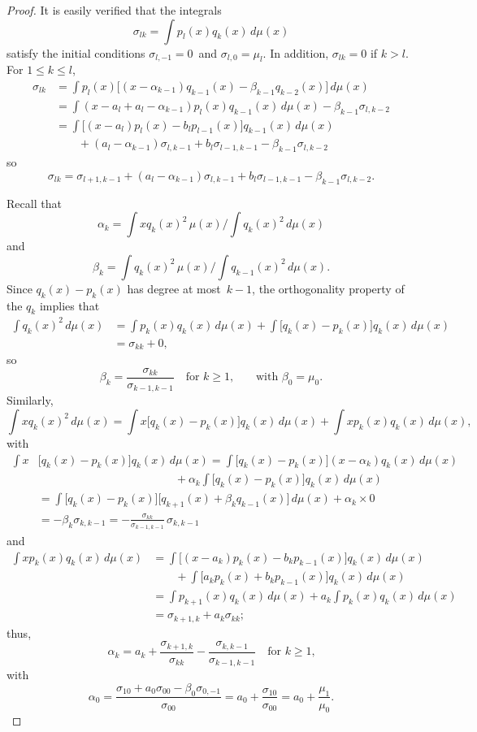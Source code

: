 \documentclass[12pt,a4paper]{article}
\begin{document}
\begin{proof}
It is easily verified that the integrals
\[
\sigma_{lk}=\int p_l(x)q_k(x)\,d\mu(x)
\]
satisfy the initial conditions $\sigma_{l,-1}=0$~and 
$\sigma_{l,0}=\mu_l$.  In addition, $\sigma_{lk}=0$ if $k>l$. 
For $1\le k\le l$,
\begin{align*}
\sigma_{lk}&=\int p_l(x)\bigl[
	(x-\alpha_{k-1})q_{k-1}(x)-\beta_{k-1}q_{k-2}(x)\bigr]\,d\mu(x)\\
	&=\int(x-a_l+a_l-\alpha_{k-1})p_l(x)q_{k-1}(x)\,d\mu(x)
		-\beta_{k-1}\sigma_{l,k-2}\\
	&=\int\bigl[(x-a_l)p_l(x)-b_lp_{l-1}(x)\bigr]
		q_{k-1}(x)\,d\mu(x)\\
	&\qquad{}+(a_l-\alpha_{k-1})\sigma_{l,k-1}
		+b_l\sigma_{l-1,k-1}-\beta_{k-1}\sigma_{l,k-2}
\end{align*}
so
\[
\sigma_{lk}=\sigma_{l+1,k-1}+(a_l-\alpha_{k-1})\sigma_{l,k-1}
		+b_l\sigma_{l-1,k-1}-\beta_{k-1}\sigma_{l,k-2}.
\]

Recall that
\[
\alpha_k=\int xq_k(x)^2\,\mu(x)\bigg/\int q_k(x)^2\,d\mu(x)
\]
and
\[
\beta_k=\int q_k(x)^2\,\mu(x)\bigg/\int q_{k-1}(x)^2\,d\mu(x).
\]
Since $q_k(x)-p_k(x)$ has degree at most~$k-1$, the orthogonality 
property of the $q_k$ implies that
\begin{align*}
\int q_k(x)^2\,d\mu(x)&=\int p_k(x)q_k(x)\,d\mu(x)
	+\int\bigl[q_k(x)-p_k(x)\bigr]q_k(x)\,d\mu(x)\\
	&=\sigma_{kk}+0,
\end{align*}
so
\[
\beta_k=\frac{\sigma_{kk}}{\sigma_{k-1,k-1}}\quad\text{for $k\ge1$,}
	\qquad\text{with $\beta_0=\mu_0$.}
\]
Similarly,
\[
\int x q_k(x)^2\,d\mu(x)
	=\int x\bigl[q_k(x)-p_k(x)\bigr]q_k(x)\,d\mu(x)
	+\int xp_k(x)q_k(x)\,d\mu(x),
\]
with
\begin{align*}
\int x&\bigl[q_k(x)-p_k(x)\bigr]q_k(x)\,d\mu(x)
	=\int\bigl[q_k(x)-p_k(x)\bigr](x-\alpha_k)q_k(x)\,d\mu(x)\\
	&\qquad\qquad\qquad\qquad\qquad\qquad{}+\alpha_k\int 
		\bigl[q_k(x)-p_k(x)\bigr]q_k(x)\,d\mu(x)\\
	&=\int\bigl[q_k(x)-p_k(x)\bigr]
	\bigl[q_{k+1}(x)+\beta_k q_{k-1}(x)\bigr] 
		\,d\mu(x)+\alpha_k\times0\\
	&=-\beta_k\sigma_{k,k-1}=-\frac{\sigma_{kk}}{\sigma_{k-1,k-1}}
	\,\sigma_{k,k-1}
\end{align*}
and
\begin{align*}
\int xp_k(x)q_k(x)\,d\mu(x)&=\int\bigl[
	(x-a_k)p_k(x)-b_kp_{k-1}(x)\bigr]q_k(x)\,d\mu(x)\\
	&\qquad{}+\int\bigl[
		a_kp_k(x)+b_kp_{k-1}(x)\bigr]q_k(x)\,d\mu(x)\\
	&=\int p_{k+1}(x)q_k(x)\,d\mu(x)+a_k\int p_k(x)q_k(x)\,d\mu(x)\\
	&=\sigma_{k+1,k}+a_k\sigma_{kk};
\end{align*}
thus,
\[
\alpha_k=a_k+\frac{\sigma_{k+1,k}}{\sigma_{kk}}
	-\frac{\sigma_{k,k-1}}{\sigma_{k-1,k-1}}
	\quad\text{for $k\ge1$,}
\]
with
\[
\alpha_0=\frac{\sigma_{10}+a_0\sigma_{00}-\beta_0\sigma_{0,-1}}%
{\sigma_{00}}=a_0+\frac{\sigma_{10}}{\sigma_{00}}
	=a_0+\frac{\mu_1}{\mu_0}.
\]
\end{proof}
\end{document}
